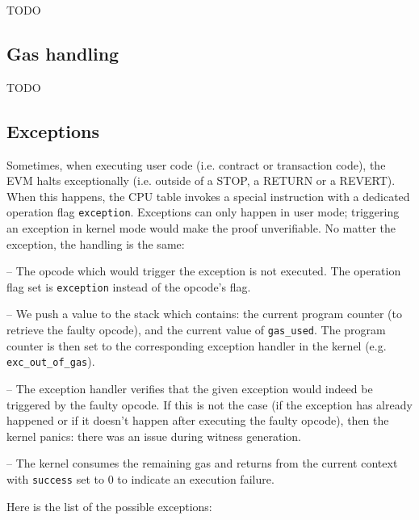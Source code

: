 TODO

\subsection{Gas handling}

TODO

\subsection{Exceptions}

Sometimes, when executing user code (i.e. contract or transaction code), the EVM halts exceptionally (i.e. outside of a STOP, a RETURN or a REVERT).
When this happens, the CPU table invokes a special instruction with a dedicated operation flag \texttt{exception}.
Exceptions can only happen in user mode; triggering an exception in kernel mode would make the proof unverifiable.
No matter the exception, the handling is the same:

-- The opcode which would trigger the exception is not executed. The operation flag set is \texttt{exception} instead of the opcode's flag.

-- We push a value to the stack which contains: the current program counter (to retrieve the faulty opcode), and the current value of \texttt{gas\_used}.
The program counter is then set to the corresponding exception handler in the kernel (e.g. \texttt{exc\_out\_of\_gas}).

-- The exception handler verifies that the given exception would indeed be triggered by the faulty opcode. If this is not the case (if the exception has already happened or if it doesn't happen after executing
the faulty opcode), then the kernel panics: there was an issue during witness generation.

-- The kernel consumes the remaining gas and returns from the current context with \texttt{success} set to 0 to indicate an execution failure.

Here is the list of the possible exceptions:

